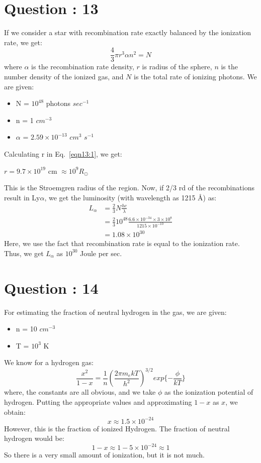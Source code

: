 \documentclass{article}
\begin{document}
\section{Question : 13}
If we consider a star with recombination rate exactly balanced by the ionization rate, we get:
\begin{equation}
\frac{4}{3}\pi r^3 \alpha n^2 = N
\label{eqn13:1}
\end{equation}
where $\alpha$ is the recombination rate density, $r$ is radius of the sphere, $n$ is the number density of the ionized gas, and $N$ is the total rate of ionizing photons. We are given:
\begin{itemize}
\item N = $10^{48}$ photons $sec^{-1}$
\item n = 1 $cm^{-3}$
\item $\alpha$ = $2.59\times 10^{-13}$ $cm^{3}$ $s^{-1}$
\end{itemize}
Calculating r in Eq.~\ref{eqn13:1}, we get:
\begin{center}
$r = 9.7\times 10^{19}$ cm $\approx 10^9 R_\odot$
\end{center}
This is the Stroemgren radius of the region. Now, if 2/3 rd of the recombinations result in Ly$\alpha$, we get the luminosity (with wavelength as 1215 \AA) as:
\begin{equation}
\begin{split}
L_{\alpha} &= \frac{2}{3}N\frac{hc}{\lambda} \\
&=\frac{2}{3}10^{48}\frac{6.6\times10^{-34}\times3\times10^8}{1215\times10^{-10}}\\
&=1.08\times 10^{30}
\end{split}
\end{equation}
Here, we use the fact that recombination rate is equal to the ionization rate. Thus, we get $L_\alpha$ as $10^{30}$ Joule per sec. 
\section{Question : 14}
For estimating the fraction of neutral hydrogen in the gas, we are given:
\begin{itemize}
\item n = 10 $cm^{-3}$
\item T = $10^3$ K
\end{itemize}
We know for a hydrogen gas:
\begin{equation}
\frac{x^2}{1-x} = \frac{1}{n}\left(\frac{2\pi m_e kT}{h^2}\right)^{3/2}exp\{-\frac{\phi}{kT}\}
\end{equation}
where, the constants are all obvious, and we take $\phi$ as the ionization potential of hydrogen. Putting the appropriate values and approximating $1-x$ as $x$, we obtain:
$$
x \approx 1.5\times 10^{-24}
$$
However, this is the fraction of ionized Hydrogen. The fraction of neutral hydrogen would be:
$$
1-x \approx 1-5\times 10^{-24} \approx 1
$$
So there is a very small amount of ionization, but it is not much. 
\end{document}
